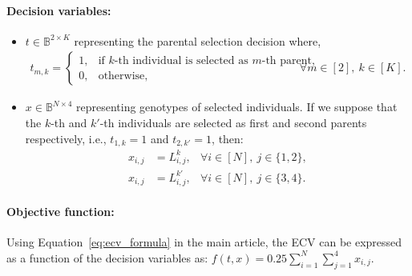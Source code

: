 \documentclass[12pt, a4paper, bibliography=totoc]{scrartcl}
\begin{document}
\paragraph{Decision variables:}
	\begin{itemize}
		\item $t \in \mathbb{B}^{2\times K}$ representing the parental selection decision where,
\begin{align*}
	t_{m,k}=
	\left\{
	\begin{array}{ll}
	1, & \text{if $k$-th individual is selected as $m$-th parent,}\\
	0, & \text{otherwise,} 
	\end{array}
	\right. &\ \forall m \in [2],\ k \in [K].
\end{align*}
\item $x \in \mathbb{B}^{N\times4}$ representing genotypes of selected individuals. If we suppose that the $k$-th and $k'$-th individuals are selected as first and second parents respectively, i.e., $t_{1,k}=1$ and $t_{2,k'}=1$, then:
\begin{align*}
    x_{i,j} & = L^{k}_{i,j},&  \forall i \in [N],\ j \in \{1,2\}, \\
    x_{i,j} &= L^{k'}_{i,j},&  \forall i \in [N],\ j \in \{3,4\}.
\end{align*}
\end{itemize}
\paragraph{Objective function:} Using  Equation~\eqref{eq:ecv_formula} in the main article, the ECV can be expressed as a function of the decision variables as: $f(t,x)=0.25\sum\limits_{i=1}^{N}\sum\limits_{j=1}^4 x_{i,j}.$
\end{document}
